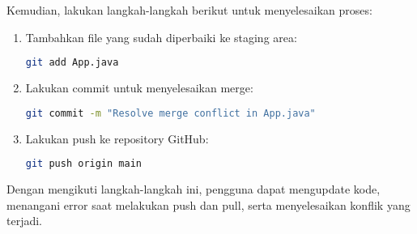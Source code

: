 Kemudian, lakukan langkah-langkah berikut untuk menyelesaikan proses:

\begin{enumerate}
	\item Tambahkan file yang sudah diperbaiki ke staging area:
	\begin{lstlisting}[language=bash]
		git add App.java
	\end{lstlisting}
	
	\item Lakukan commit untuk menyelesaikan merge:
	\begin{lstlisting}[language=bash]
		git commit -m "Resolve merge conflict in App.java"
	\end{lstlisting}
	
	\item Lakukan push ke repository GitHub:
	\begin{lstlisting}[language=bash]
		git push origin main
	\end{lstlisting}
\end{enumerate}

Dengan mengikuti langkah-langkah ini, pengguna dapat mengupdate kode, menangani error saat melakukan push dan pull, serta menyelesaikan konflik yang terjadi.





